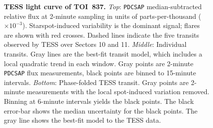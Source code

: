\documentclass[12pt,twocolumn,tighten]{aastex63}
\newcommand{\tn}{TOI~837} %
\begin{document}
\begin{figure}[!t]
	\begin{center}
		\leavevmode
		
		\vspace{-0.5cm}
	\end{center}
	\vspace{-0.6cm}
	\caption{
    {\bf TESS light curve of \tn.}
    {\it Top}:
    \texttt{PDCSAP} median-subtracted relative flux at 2-minute
    sampling in units of parts-per-thousand ($\times 10^{-3}$).
    Starspot-induced variability is the dominant signal; flares are
    shown with red crosses.  Dashed lines indicate the five transits
    observed by TESS over Sectors 10 and 11.  {\it Middle}: Individual
    transits.  Gray lines are the best-fit transit model, which
    includes a local quadratic trend in each window. Gray points are
    2-minute \texttt{PDCSAP} flux measurements, black points are
    binned to 15-minute intervals.  {\it Bottom}: Phase-folded TESS
    transit.  Gray points are 2-minute measurements with the local
    spot-induced variation removed.  Binning at 6-minute intervals
    yields the black points.  The black error-bar shows the median
    uncertainty for the black points.  The gray line shows the
    best-fit model to the TESS data. 
		\label{fig:tessphot}
	}
\end{figure}
\end{document}
